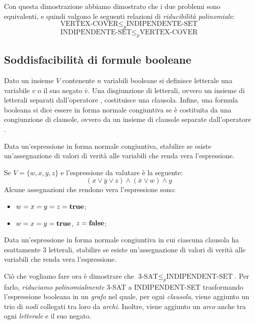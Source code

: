\noindent
Con questa dimostrazione abbiamo dimostrato che i due problemi sono equivalenti,
e quindi valgono le seguenti relazioni di \emph{riducibilità polinomiale}:
\[\text{VERTEX-COVER}\leq_p\text{INDIPENDENTE-SET}\]
\[\text{INDIPENDENTE-SET}\leq_p\text{VERTEX-COVER}\]

\subsection{Soddisfacibilità di formule booleane}
\begin{definition}
    Dato un insieme $V$ contenente $n$ variabili booleane si definisce letterale
    una variabile $v$ o il suo negato $\bar{v}$. Una disgiunzione di letterali,
    ovvero un insieme di letterali separati dall'operatore , costituisce
    una clausola. Infine, una formula booleana si dice essere in forma normale
    congiuntiva se è costituita da una congiunzione di clausole, ovvero da un
    insieme di clausole separate dall'operatore .
\end{definition}
\begin{problem}
    Data un'espressione in forma normale congiuntiva, stabilire se esiste
    un'assegnazione di valori di verità alle variabili che renda vera l'espressione.
\end{problem}
\begin{eg}[Esempio]
    Se $V=\{w,x,y,z\}$ e l'espressione da valutare è la seguente:
    \[(x\vee\bar{y}\vee z)\wedge(\bar{x}\vee w)\wedge y\]
    Alcune assegnazioni che rendono vera l'espressione sono:
    \begin{itemize}
        \item $w=x=y=z={\bf true}$;
        \item $w=x=y={\bf true}$, $z={\bf false}$;
    \end{itemize}
\end{eg}
\begin{problem}
    Data un'espressione in forma normale congiuntiva in cui ciascuna clausola ha
    esattamente 3 letterali, stabilire se esiste un'assegnazione di valori di
    verità alle variabili che renda vera l'espressione.
\end{problem}

\noindent
Ciò che vogliamo fare ora è dimostrare che $\text{3-SAT}\leq_p\text{INDIPENDENT-SET}$.
Per farlo, \emph{riduciamo polinomialmente} 3-SAT a INDIPENDENT-SET trasformando
l'espressione booleana in un \emph{grafo} nel quale, per ogni \emph{clausola},
viene aggiunto un trio di \emph{nodi} collegati tra loro da \emph{archi}.
Inoltre, viene aggiunto un \emph{arco} anche tra ogni \emph{letterale} e il
suo negato.

